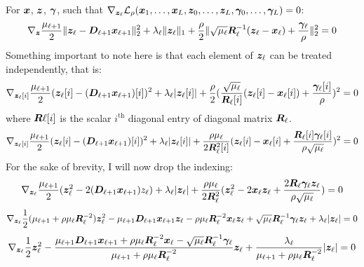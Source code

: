 For $\bm{x}$, $\bm{z}$, $\bm{\gamma}$, such that $\nabla_{\bm{z}_{\ell}} \mathcal{L}_{\rho}(\bm{x}_1,\hdots,\bm{x}_L,\bm{z}_0,\hdots,\bm{z}_L,\bm{\gamma}_0,\hdots,\bm{\gamma}_L) = 0$:
%
\begin{equation}
\nabla_{\bm{z}} \frac{\mu_{\ell + 1}}{2}\|\bm{z}_{\ell} - \bm{D}_{\ell + 1}\bm{x}_{\ell + 1}\|_2^2 + \lambda_{\ell}\|\bm{z}_{\ell}\|_1 + \frac{\rho}{2} \|\sqrt{\mu_{\ell}}\bm{R}_{\ell}^{-1}(\bm{z}_{\ell} - \bm{x}_{\ell}) + \frac{\bm{\gamma}_{\ell}}{\rho}\|_2^2 = 0
\end{equation}
%
Something important to note here is that each element of $\bm{z}_{\ell}$ can be treated independently, that is:
%
\begin{equation}
\nabla_{\bm{z}_{\ell}[i]} \frac{\mu_{\ell + 1}}{2}(\bm{z}_{\ell}[i] - (\bm{D}_{\ell + 1}\bm{x}_{\ell + 1})[i])^2 + \lambda_{\ell}|\bm{z}_{\ell}[i]| + \frac{\rho}{2} (\frac{\sqrt{\mu_{\ell}}}{\bm{R}_{\ell}[i]}(\bm{z}_{\ell}[i] - \bm{x}_{\ell}[i]) + \frac{\bm{\gamma}_{\ell}[i]}{\rho})^2 = 0
\end{equation}
%
where $\bm{R}{\ell}[i]$ is the scalar $i^{\text{th}}$ diagonal entry of diagonal matrix $\bm{R}_{\ell}$.
%
\begin{equation}
\nabla_{\bm{z}_{\ell}[i]} \frac{\mu_{\ell + 1}}{2}(\bm{z}_{\ell}[i] - (\bm{D}_{\ell + 1}\bm{x}_{\ell + 1})[i])^2 + \lambda_{\ell}|\bm{z}_{\ell}[i]| + \frac{\rho\mu_{\ell}}{2\bm{R}_{\ell}^2[i]} (\bm{z}_{\ell}[i] - \bm{x}_{\ell}[i] + \frac{\bm{R}_{\ell}[i]\bm{\gamma}_{\ell}[i]}{\rho\sqrt{\mu_{\ell}}})^2 = 0
\end{equation}
%
For the sake of brevity, I will now drop the indexing:
%
\begin{equation}
\nabla_{\bm{z}_{\ell}} \frac{\mu_{\ell + 1}}{2}(\bm{z}_{\ell}^2 - 2(\bm{D}_{\ell + 1}\bm{x}_{\ell + 1})z_{\ell}) + \lambda_{\ell}|\bm{z}_{\ell}| + \frac{\rho\mu_{\ell}}{2\bm{R}_{\ell}^2} (\bm{z}_{\ell}^2 - 2\bm{x}_{\ell}\bm{z}_{\ell} + \frac{2\bm{R}_{\ell}\bm{\gamma}_{\ell}\bm{z}_{\ell}}{\rho\sqrt{\mu_{\ell}}}) = 0
\end{equation}
%
\begin{equation}
\nabla_{\bm{z}_{\ell}} \frac{1}{2}(\mu_{\ell + 1} + \rho\mu_{\ell}\bm{R}_{\ell}^{-2})\bm{z}_{\ell}^2 - \mu_{\ell + 1}\bm{D}_{\ell + 1}\bm{x}_{\ell + 1}\bm{z}_{\ell} - \rho\mu_{\ell}\bm{R}_{\ell}^{-2}\bm{x}_{\ell}\bm{z}_{\ell} + \sqrt{\mu_{\ell}}\bm{R}_{\ell}^{-1}\bm{\gamma}_{\ell}\bm{z}_{\ell} + \lambda_{\ell}|\bm{z}_{\ell}| = 0
\end{equation}
%
\begin{equation}
\nabla_{\bm{z}_{\ell}} \frac{1}{2}\bm{z}_{\ell}^2 - \frac{\mu_{\ell + 1}\bm{D}_{\ell + 1}\bm{x}_{\ell + 1} + \rho\mu_{\ell}\bm{R}_{\ell}^{-2}\bm{x}_{\ell} - \sqrt{\mu_{\ell}}\bm{R}_{\ell}^{-1}\bm{\gamma}_{\ell}}{\mu_{\ell + 1} + \rho\mu_{\ell}\bm{R}_{\ell}^{-2}}\bm{z}_{\ell} + \frac{\lambda_{\ell}}{\mu_{\ell + 1} + \rho\mu_{\ell}\bm{R}_{\ell}^{-2}}|\bm{z}_{\ell}| = 0
\end{equation}
